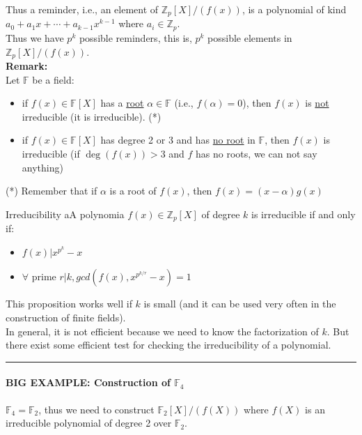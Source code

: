\noindent
Thus a reminder, i.e., an element of $\mathbb{Z}_p[X] / (f(x))$, is a polynomial of kind $a_0 + a_1x + \cdots + a_{k-1}x^{k-1}$ where $a_i \in \mathbb{Z}_p$.\\
\smallskip
\noindent
Thus we have $p^k$ possible reminders, this is, $p^k$ possible elements in $\mathbb{Z}_p[X] / (f(x))$.\\


\newpage
\noindent
\textbf{Remark:}\\
Let $\mathbb{F}$ be a field:
\begin{itemize}
    \item if $f(x) \in \mathbb{F}[X]$ has a \underline{root} $\alpha \in \mathbb{F}$ (i.e., $f(\alpha) = 0$), then $f(x)$ is \underline{not} irreducible (it is irreducible). (*)
    \item if $f(x) \in \mathbb{F}[X]$ has degree 2 or 3 and has \underline{no root} in $\mathbb{F}$, then $f(x)$ is irreducible (if $\deg(f(x)) > 3$ and $f$ has no roots, we can not say anything)
\end{itemize}
\noindent
(*) Remember that if $\alpha$ is a root of $f(x)$, then $f(x) = (x - \alpha)g(x)$

\medskip
\begin{propBox}{Irreducibility}
    aA polynomia $f(x) \in \mathbb{Z}_p[X]$ of degree $k$ is irreducible if and only if:
    \begin{itemize}
        \item $f(x) | x^{p^k} - x$
        \item $\forall$ prime $r | k, gcd(f(x), x^{p^{k/r}} - x) = 1$ 
    \end{itemize}
\end{propBox}
\noindent
This proposition works well if $k$ is small (and it can be used very often in the construction of finite fields).\\
In general, it is not efficient  because we need to know the factorization of $k$. But there exist some efficient test for checking the irreducibility of a polynomial.

\noindent\rule{\textwidth}{0.5pt}

\noindent
\paragraph{BIG EXAMPLE: Construction of $\mathbb{F}_4$} 
\noindent
$\mathbb{F}_4 = \mathbb{F}_2$, thus we need to construct $\mathbb{F}_2[X] / (f(X))$ where $f(X)$ is an irreducible polynomial of degree 2 over $\mathbb{F}_2$.
\smallskip

